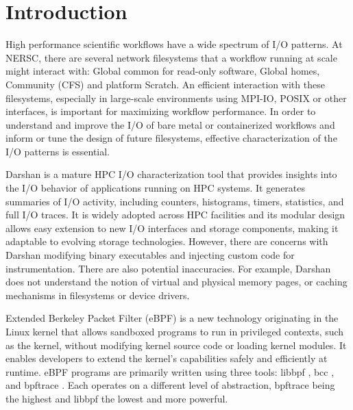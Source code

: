 \documentclass[sigconf]{acmart}
\begin{document}



\maketitle

\section{Introduction}
High performance scientific workflows have a wide spectrum of I/O patterns\cite{bez2023io}.
At NERSC, there are several network filesystems that a workflow running at scale might interact with: Global common for read-only software, Global homes, Community (CFS) and platform Scratch. 
An efficient interaction with these filesystems, especially in large-scale environments using MPI-IO, POSIX or other interfaces, is important for maximizing workflow performance.
In order to understand and improve the I/O of bare metal or containerized workflows and inform or tune the design of future filesystems, effective characterization of the I/O patterns is essential.

Darshan\cite{snyder2016modular} is a mature HPC I/O characterization tool that provides insights into the I/O behavior of applications running on HPC systems. It generates summaries of I/O activity, including counters, histograms, timers, statistics, and full I/O traces. It is widely adopted across HPC facilities and its modular design allows easy extension to new I/O interfaces and storage components, making it adaptable to evolving storage technologies. However, there are concerns with Darshan modifying binary executables and injecting custom code for instrumentation. There are also potential inaccuracies. For example, Darshan does not understand the notion of virtual and physical memory pages, or caching mechanisms in filesystems or device drivers. 

Extended Berkeley Packet Filter (eBPF) \cite{fleming2017ebpf} is a new technology originating in the Linux kernel that allows sandboxed programs to run in privileged contexts, such as the kernel, without modifying kernel source code or loading kernel modules. It enables developers to extend the kernel’s capabilities safely and efficiently at runtime. eBPF programs are primarily written using three tools: libbpf \cite{nakryiko2022libbpf}, bcc \cite{fleming2017bcc}, and bpftrace \cite{bpftrace_github}. Each operates on a different level of abstraction, bpftrace being the highest and libbpf the lowest and more powerful.
\end{document}
